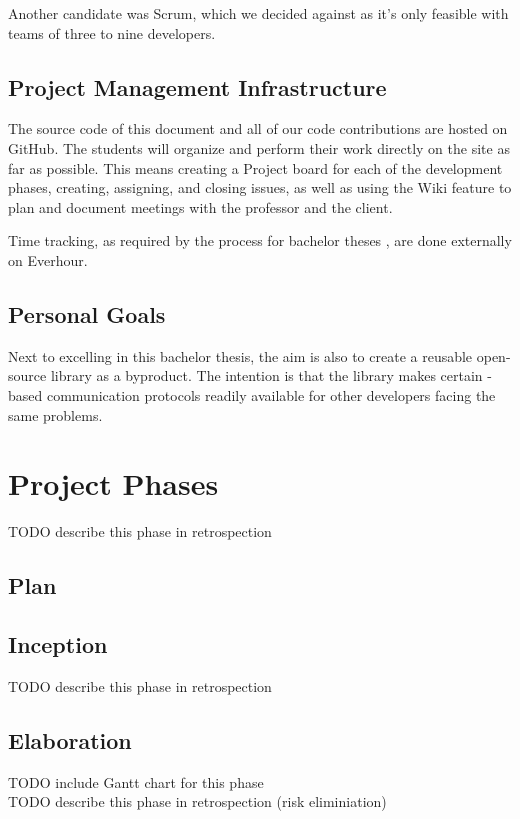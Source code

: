 Another candidate was Scrum, which we decided against as it’s only feasible
with teams of three to nine developers.

\section{Project Management Infrastructure}
The source code of this document and all of our code contributions are hosted
on GitHub. The students will organize and perform their work directly on the
site as far as possible. This means creating a Project board for each of the
development phases, creating, assigning, and closing issues, as well as using
the Wiki feature to plan and document meetings with the professor and the
client.

Time tracking, as required by the process for bachelor theses
\cite{hsr:thesis-rules}, are done externally on Everhour.

\section{Personal Goals}
Next to excelling in this bachelor thesis, the aim is also to create a
reusable open-source library as a byproduct. The intention is that the library
makes certain \zmq-based communication protocols readily available for other
developers facing the same problems.


\chapter{Project Phases}
TODO describe this phase in retrospection\\


\section{Plan}

\section{Inception}
TODO describe this phase in retrospection\\

\section{Elaboration}
TODO include Gantt chart for this phase\\
TODO describe this phase in retrospection (risk eliminiation)\\

